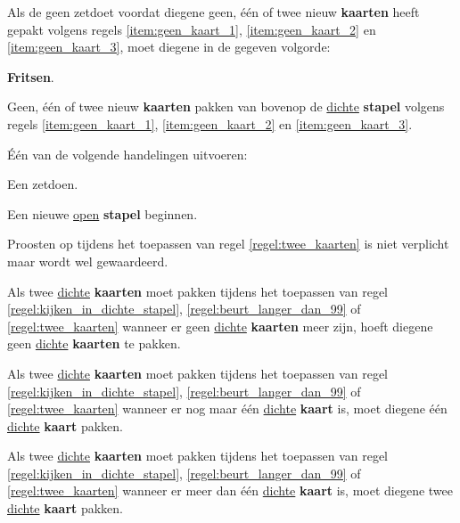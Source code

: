 \vervolgLijst{}
\item \label{regel:twee_kaarten} Als de \huidigeSpeler geen zet\footnotemark[4] doet voordat diegene geen, \'e\'en of twee nieuw \textbf{kaarten} heeft gepakt volgens regels \ref{item:geen_kaart_1}, \ref{item:geen_kaart_2} en \ref{item:geen_kaart_3}, moet diegene in de gegeven volgorde:
\puntLijst{}
\item \textbf{Fritsen}.
\item Geen, \'e\'en of twee nieuw \textbf{kaarten} pakken van bovenop de \ul{dichte} \textbf{stapel} volgens regels \ref{item:geen_kaart_1}, \ref{item:geen_kaart_2} en \ref{item:geen_kaart_3}.
\item Één van de volgende handelingen uitvoeren:
\numeriekeLijst{}
\item Een zet\footnotemark[4] doen.
\item Een nieuwe \ul{open} \textbf{stapel} beginnen.
\eindNumeriekeLijst{}
\eindPuntLijst{}
\eindLijst{}

\vervolgLijst{}
\item Proosten op  tijdens het toepassen van regel \ref{regel:twee_kaarten} is niet verplicht maar wordt wel gewaardeerd.
\eindLijst{}

\vervolgLijst{}
\item Als \eenSpeler twee \ul{dichte} \textbf{kaarten} moet pakken tijdens het toepassen van regel \ref{regel:kijken_in_dichte_stapel}, \ref{regel:beurt_langer_dan_99} of \ref{regel:twee_kaarten} wanneer er geen \ul{dichte} \textbf{kaarten} meer zijn, hoeft diegene geen \ul{dichte} \textbf{kaarten} te pakken.
\label{item:geen_kaart_1}
\eindLijst{}

\vervolgLijst{}
\item Als \eenSpeler twee \ul{dichte} \textbf{kaarten} moet pakken tijdens het toepassen van regel \ref{regel:kijken_in_dichte_stapel}, \ref{regel:beurt_langer_dan_99} of \ref{regel:twee_kaarten} wanneer er nog maar \'e\'en \ul{dichte} \textbf{kaart} is, moet diegene \'e\'en \ul{dichte} \textbf{kaart} pakken.
\label{item:geen_kaart_2}
\eindLijst{}

\vervolgLijst{}
\item Als \eenSpeler twee \ul{dichte} \textbf{kaarten} moet pakken tijdens het toepassen van regel \ref{regel:kijken_in_dichte_stapel}, \ref{regel:beurt_langer_dan_99} of \ref{regel:twee_kaarten} wanneer er meer dan \'e\'en \ul{dichte} \textbf{kaart} is, moet diegene twee \ul{dichte} \textbf{kaart} pakken.
\label{item:geen_kaart_3}
\eindLijst{}

